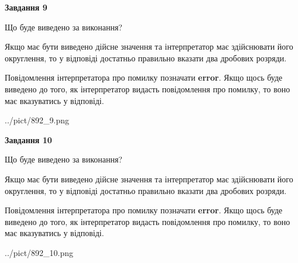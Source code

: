 \documentclass[12pt, ukrainian]{article}
\begin{document}
{\begin {Large}
{\begin {center}\textbf{Завдання 9}\end {center}}\par
Що буде виведено за виконання? \par

Якщо має бути виведено дійсне значення та інтерпретатор має здійснювати його округлення, 
то у відповіді достатньо правильно вказати два дробових розряди.

Повідомлення інтерпретатора про помилку позначати \textbf{error}.
Якщо щось буде виведено до того, як інтерпретатор видасть повідомлення про помилку, 
то воно має вказуватись у відповіді. \par

\begin{center}
	{../pict/892_9.png}
\end{center}
\newpage

{\begin {center}\textbf{Завдання 10}\end {center}}\par
Що буде виведено за виконання? \par

Якщо має бути виведено дійсне значення та інтерпретатор має здійснювати його округлення, 
то у відповіді достатньо правильно вказати два дробових розряди.

Повідомлення інтерпретатора про помилку позначати \textbf{error}.
Якщо щось буде виведено до того, як інтерпретатор видасть повідомлення про помилку, 
то воно має вказуватись у відповіді. \par

\begin{center}
	{../pict/892_10.png}
\end{center}
\newpage

\end {Large}}
\end{document}
